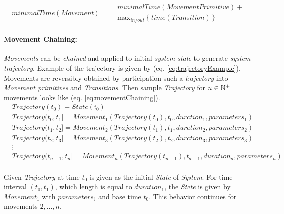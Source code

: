     \begin{equation}\label{eq:minimalMovementTime}
        minimalTime(Movement)=
        \begin{aligned}
        &minimalTime(MovementPrimitive) +\\ &\text{max}_{in/out}\left\{time(Transition)\right\}
        \end{aligned}
    \end{equation}
   
    \paragraph{Movement Chaining:}\emph{Movements} can be \emph{chained} and applied to initial \emph{system state} to generate \emph{system trajectory}. Example of the trajectory is given by (eq. \ref{eq:trajectoryExample}). Movements are reversibly obtained by participation such a \emph{trajectory} into \emph{Movement primitives} and \emph{Transitions}. Then sample \emph{Trajectory} for $n\in \mathbb{N}^+$ movements looks like (eq. \ref{eq:movementChaining}).
    \begin{equation}\label{eq:movementChaining}
        \begin{aligned}
        &Trajectory(t_0)=State(t_0)\\
        &Trajectory(t_0,t_1]=Movement_1(Trajectory(t_0),t_0,duration_1,parameters_1)\\
        &Trajectory(t_1,t_2]=Movement_2(Trajectory(t_1),t_1,duration_2,parameters_2)\\
        &Trajectory(t_2,t_3]=Movement_3(Trajectory(t_2),t_2,duration_3,parameters_3)\\
        &\vdots\\
        &Trajectory(t_{n-1},t_n]=Movement_n(Trajectory(t_{n-1}),t_{n-1},duration_n,parameters_n)\\
        \end{aligned}
    \end{equation}

    Given \emph{Trajectory} at time $t_0$ is given as the initial \emph{State} of \emph{System}. For time interval $(t_0,t_1)$, which length is equal to $duration_1$, the \emph{State} is given by $Movement_1$ with $parameters_1$ and base time $t_0$. This behavior continues for movements $2,\dots,n$. 

